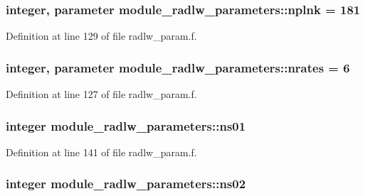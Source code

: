 \subsubsection[{\texorpdfstring{nplnk}{nplnk}}]{\setlength{\rightskip}{0pt plus 5cm}integer, parameter module\+\_\+radlw\+\_\+parameters\+::nplnk = 181}\hypertarget{group__module__radlw__main_ga7ade2de4de94ec6e7a0e97321143e2e6}{}\label{group__module__radlw__main_ga7ade2de4de94ec6e7a0e97321143e2e6}


Definition at line 129 of file radlw\+\_\+param.\+f.

\subsubsection[{\texorpdfstring{nrates}{nrates}}]{\setlength{\rightskip}{0pt plus 5cm}integer, parameter module\+\_\+radlw\+\_\+parameters\+::nrates = 6}\hypertarget{group__module__radlw__main_ga86288e4bbe3d6962505488790ff42bfa}{}\label{group__module__radlw__main_ga86288e4bbe3d6962505488790ff42bfa}


Definition at line 127 of file radlw\+\_\+param.\+f.

\subsubsection[{\texorpdfstring{ns01}{ns01}}]{\setlength{\rightskip}{0pt plus 5cm}integer module\+\_\+radlw\+\_\+parameters\+::ns01}\hypertarget{group__module__radlw__main_ga0f82508bbb4039ebbc3fcb68e8e4e699}{}\label{group__module__radlw__main_ga0f82508bbb4039ebbc3fcb68e8e4e699}


Definition at line 141 of file radlw\+\_\+param.\+f.

\subsubsection[{\texorpdfstring{ns02}{ns02}}]{\setlength{\rightskip}{0pt plus 5cm}integer module\+\_\+radlw\+\_\+parameters\+::ns02}\hypertarget{group__module__radlw__main_ga8b13d877f08e7c26333285fd1db19d4e}{}\label{group__module__radlw__main_ga8b13d877f08e7c26333285fd1db19d4e}


